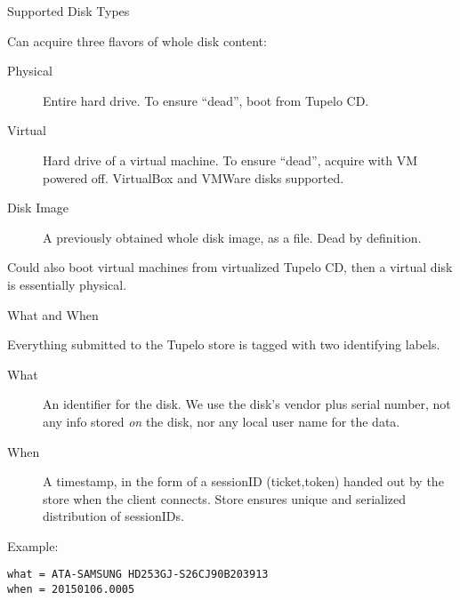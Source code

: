 \documentclass{beamer}
\begin{document}

\begin{frame}{Supported Disk Types}

Can acquire three flavors of whole disk content:

\begin{description}
\item[Physical] Entire hard drive.  To ensure ``dead'', boot from
  Tupelo CD.

\item[Virtual] Hard drive of a virtual machine.  To ensure ``dead'',
  acquire with VM powered off.  VirtualBox and VMWare disks supported.

\item[Disk Image] A previously obtained whole disk image, as a file.
  Dead by definition.
\end{description}

Could also boot virtual machines from virtualized Tupelo CD, then 
a virtual disk is essentially physical.

\end{frame}


\begin{frame}[fragile]{What and When}

Everything submitted to the Tupelo store is tagged with two
identifying labels.

\begin{description}
\item[What]  An identifier for the disk.  We use the disk's vendor
  plus serial number, not any info stored {\em on} the disk, nor any
  local user name for the data.  

\item[When] A timestamp, in the form of a sessionID (ticket,token)
  handed out by the store when the client connects.  Store ensures
  unique and serialized distribution of sessionIDs.
\end{description}

Example:
\begin{verbatim}
what = ATA-SAMSUNG HD253GJ-S26CJ90B203913
when = 20150106.0005
\end{verbatim}

\end{frame}

\end{document}
